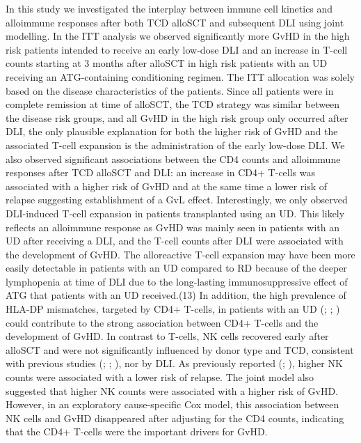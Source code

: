 \documentclass[
  letterpaper,
  paper=240mm:170mm,
  twoside=true,
  open=right,
  fontsize=10pt,
  pagesize=false,
  BCOR=15mm,
  DIV=14,
  headinclude=true,
  footinclude=false,
  headsepline=on]{scrbook}
\begin{document}
In this study we investigated the interplay between immune cell kinetics
and alloimmune responses after both TCD alloSCT and subsequent DLI using
joint modelling. In the ITT analysis we observed significantly more GvHD
in the high risk patients intended to receive an early low-dose DLI and
an increase in T-cell counts starting at 3 months after alloSCT in high
risk patients with an UD receiving an ATG-containing conditioning
regimen. The ITT allocation was solely based on the disease
characteristics of the patients. Since all patients were in complete
remission at time of alloSCT, the TCD strategy was similar between the
disease risk groups, and all GvHD in the high risk group only occurred
after DLI, the only plausible explanation for both the higher risk of
GvHD and the associated T-cell expansion is the administration of the
early low-dose DLI. We also observed significant associations between
the CD4 counts and alloimmune responses after TCD alloSCT and DLI: an
increase in CD4+ T-cells was associated with a higher risk of GvHD and
at the same time a lower risk of relapse suggesting establishment of a
GvL effect. Interestingly, we only observed DLI-induced T-cell expansion
in patients transplanted using an UD. This likely reflects an alloimmune
response as GvHD was mainly seen in patients with an UD after receiving
a DLI, and the T-cell counts after DLI were associated with the
development of GvHD. The alloreactive T-cell expansion may have been
more easily detectable in patients with an UD compared to RD because of
the deeper lymphopenia at time of DLI due to the long-lasting
immunosuppressive effect of ATG that patients with an UD received.(13)
In addition, the high prevalence of HLA-DP mismatches, targeted by CD4+
T-cells, in patients with an UD
(;
;
) could contribute to the strong association between CD4+ T-cells
and the development of GvHD. In contrast to T-cells, NK cells recovered
early after alloSCT and were not significantly influenced by donor type
and TCD, consistent with previous studies
(;
;
), nor by DLI. As previously reported
(; ), higher NK counts were associated with a lower
risk of relapse. The joint model also suggested that higher NK counts
were associated with a higher risk of GvHD. However, in an exploratory
cause-specific Cox model, this association between NK cells and GvHD
disappeared after adjusting for the CD4 counts, indicating that the CD4+
T-cells were the important drivers for GvHD.
\end{document}
